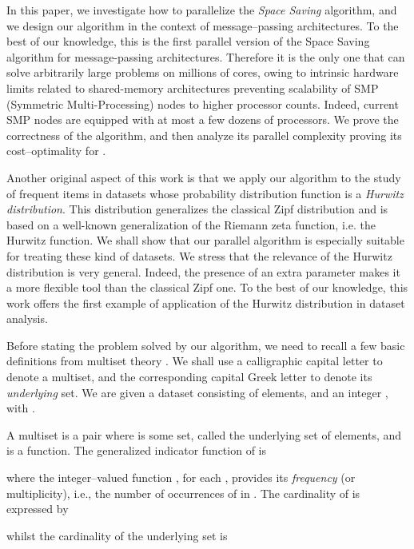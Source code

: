 \documentclass[final,3p,times]{elsarticle}
\newcommand\noi{\noindent}
\begin{document}
In this paper, we investigate how to parallelize the \emph{Space Saving} algorithm, and we design our algorithm in the context of message--passing architectures. To the best of our knowledge, this is the first parallel version of the Space Saving algorithm for message-passing architectures. Therefore it is the only one that can solve arbitrarily large problems on millions of cores, owing to intrinsic hardware limits related to shared-memory architectures preventing scalability of SMP (Symmetric Multi-Processing) nodes to higher processor counts. Indeed, current SMP nodes are equipped with at most a few dozens of processors. We prove the correctness of the algorithm, and then analyze its parallel complexity proving its cost--optimality for .

Another original aspect of this work is that we apply our algorithm to the study of frequent items in datasets whose probability distribution function is a \emph{Hurwitz distribution}. This distribution generalizes the classical Zipf distribution and is based on a well-known generalization of the Riemann zeta function, i.e. the Hurwitz function. We shall show that our parallel algorithm is especially suitable for treating these kind of datasets. We stress that the relevance of the Hurwitz distribution is very general. Indeed, the presence of an extra parameter makes it a more flexible tool than the classical Zipf one. To the best of our knowledge, this work offers the first example of application of the Hurwitz distribution in dataset analysis.

Before stating the problem solved by our algorithm, we need to recall a few basic definitions from multiset theory \cite{Syropoulos01}. We shall use a calligraphic capital letter to denote a multiset, and the corresponding capital Greek letter to denote its \textit{underlying} set. We are given a dataset  consisting of  elements, and an integer , with .


\begin{defn}
\label{multiset}
A multiset  is a pair where  is some set, called the underlying set of elements, and  is a function.
The generalized indicator function of  is 

 
\noindent where the integer--valued function , for each , provides its  \textit{frequency} (or multiplicity), i.e., the number of occurrences of  in . 
\noi The cardinality of  is expressed by




\noi whilst the cardinality of the underlying set  is


\end{defn}
\end{document}
